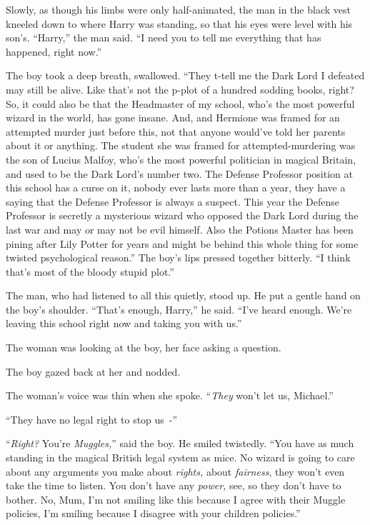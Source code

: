 Slowly, as though his limbs were only half-animated, the man in the black vest kneeled down to where Harry was standing, so that his eyes were level with his son's. ``Harry,'' the man said. ``I need you to tell me everything that has happened, right now.''

The boy took a deep breath, swallowed. ``They t-tell me the Dark Lord I defeated may still be alive. Like that's not the p-plot of a hundred sodding books, right? So, it could also be that the Headmaster of my school, who's the most powerful wizard in the world, has gone insane. And, and Hermione was framed for an attempted murder just before this, not that anyone would've told her parents about it or anything. The student she was framed for attempted-murdering was the son of Lucius Malfoy, who's the most powerful politician in magical Britain, and used to be the Dark Lord's number two. The Defense Professor position at this school has a curse on it, nobody ever lasts more than a year, they have a saying that the Defense Professor is always a suspect. This year the Defense Professor is secretly a mysterious wizard who opposed the Dark Lord during the last war and may or may not be evil himself. Also the Potions Master has been pining after Lily Potter for years and might be behind this whole thing for some twisted psychological reason.'' The boy's lips pressed together bitterly. ``I think that's most of the bloody stupid plot.''

The man, who had listened to all this quietly, stood up. He put a gentle hand on the boy's shoulder. ``That's enough, Harry,'' he said. ``I've heard enough. We're leaving this school right now and taking you with us.''

The woman was looking at the boy, her face asking a question.

The boy gazed back at her and nodded.

The woman's voice was thin when she spoke. ``\emph{They} won't let us, Michael.''

``They have no legal right to stop us~-''

``\emph{Right?} You're \emph{Muggles,}'' said the boy. He smiled twistedly. ``You have as much standing in the magical British legal system as mice. No wizard is going to care about any arguments you make about \emph{rights,} about \emph{fairness}, they won't even take the time to listen. You don't have any \emph{power,} see, so they don't have to bother. No, Mum, I'm not smiling like this because I agree with their Muggle policies, I'm smiling because I disagree with your children policies.''

